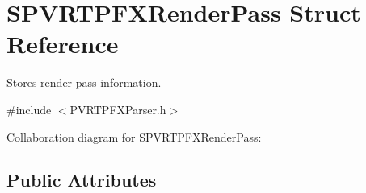 \hypertarget{struct_s_p_v_r_t_p_f_x_render_pass}{\section{S\+P\+V\+R\+T\+P\+F\+X\+Render\+Pass Struct Reference}
\label{struct_s_p_v_r_t_p_f_x_render_pass}
}


Stores render pass information.  




{\ttfamily \#include $<$P\+V\+R\+T\+P\+F\+X\+Parser.\+h$>$}



Collaboration diagram for S\+P\+V\+R\+T\+P\+F\+X\+Render\+Pass\+:
\subsection*{Public Attributes}
